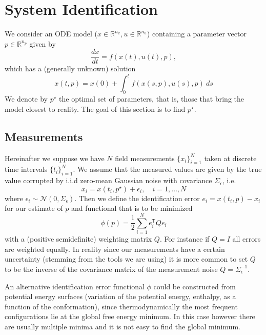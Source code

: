 \documentclass[a4paper]{article}
\newcommand{\T}{\mathsf{T}}
\theoremstyle{plain}
\theoremstyle{definition}
\theoremstyle{remark}
\begin{document}

\section{System Identification}

We consider an ODE model ($x \in \mathbb{R}^{n_x}, u \in \mathbb{R}^{n_u}$)
containing a parameter vector $p \in \mathbb{R}^{n_p}$ given by
\begin{equation} \label{eqn:dynamics-p}
  \frac{dx}{dt} = f(x(t), u(t), p),
\end{equation}
which has a (generally unknown) solution
\begin{equation} \label{eqn:sol-p}
  x(t, p) = x(0) + \int_0^t f(x(s, p), u(s), p) ~ ds
\end{equation}
We denote by $p^\star$ the optimal set of parameters, that is, those that
bring the model closest to reality. The goal of this section is to find
$p^\star$.

\subsection{Measurements}

Hereinafter we suppose we have $N$ field measurements $\{x_i\}_{i=1}^N$ taken
at discrete time intervals $\{t_i\}_{i=1}^N$. We assume that the measured
values are given by the true value corrupted by i.i.d zero-mean Gaussian noise
with covariance $\Sigma_\epsilon$, i.e.
\begin{equation} \label{eqn:measurement-model}
  x_i = x(t_i, p^\star) + \epsilon_i, \quad i = 1, \ldots, N
\end{equation}
where  $\epsilon_i \sim \mathcal{N}(0, \Sigma_\epsilon)$. Then we define the
identification error $e_i = x(t_i, p) - x_i$ for our estimate of $p$ and
functional that is to be minimized
\[
  \phi(p) = \frac{1}{2} \sum_{i=1}^N e_i^\T Q e_i
\]
with a (positive semidefinite) weighting matrix $Q$. For instance if $Q = I$
all errors are weighted equally. In reality since our measurements have a
certain uncertainty (stemming from the tools we are using) it is more common
to set $Q$ to be the inverse of the covariance matrix of the measurement noise
$Q = \Sigma_\epsilon^{-1}$.

An alternative identification error functional $\phi$ could be constructed
from potential energy surfaces (variation of the potential energy, enthalpy,
as a function of the conformation), since thermodynamically the most frequent
configurations lie at the global free energy minimum. In this case however
there are usually multiple minima and it is not easy to find the global
minimum.
\end{document}
